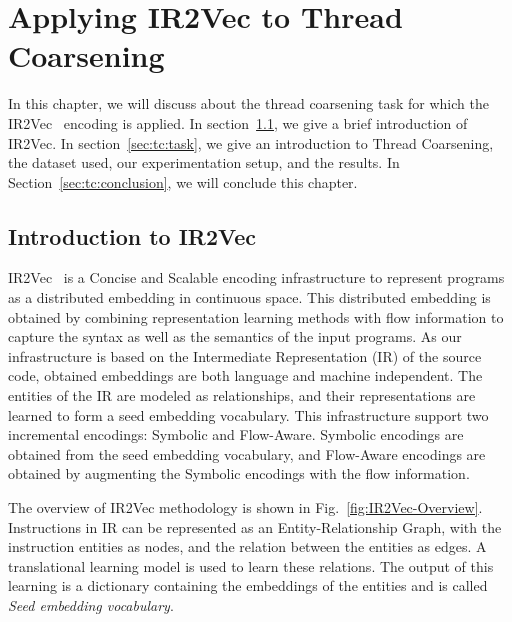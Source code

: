 \chapter{Applying IR2Vec to Thread Coarsening}
\label{chap:ch2}

In this chapter, we will discuss about the thread coarsening task for which the IR2Vec~\cite{IR2Vec} encoding is applied. In section~\ref{sec:tc:introir2vec}, we give a brief introduction of IR2Vec. In section~\ref{sec:tc:task}, we give an introduction to Thread Coarsening, the dataset used, our experimentation setup, and the results. 
In Section~\ref{sec:tc:conclusion}, we will conclude this chapter.


\section{Introduction to IR2Vec}\label{sec:tc:introir2vec}
IR2Vec~\cite{IR2Vec} is a Concise and Scalable encoding infrastructure to represent programs as a distributed embedding in continuous space. This distributed embedding is obtained by combining representation learning methods with flow information to capture the syntax as well as the semantics of the input programs. As our infrastructure is based on the Intermediate Representation (IR) of the source code, obtained embeddings are both language and machine independent. The entities of the IR are modeled as relationships, and their
representations are learned to form a seed embedding vocabulary. This infrastructure support two incremental encodings: Symbolic and Flow-Aware. Symbolic encodings are obtained from the seed embedding vocabulary, and Flow-Aware encodings are obtained by augmenting the Symbolic encodings with the flow information.

The overview of IR2Vec methodology is shown in Fig.~\ref{fig:IR2Vec-Overview}. Instructions in IR can be represented as an Entity-Relationship Graph, with the instruction entities as nodes, and the relation between the entities as edges. A translational learning model is used to learn these relations. The output of this learning is a dictionary containing the embeddings of the entities and is called \textit{Seed embedding vocabulary}. 

